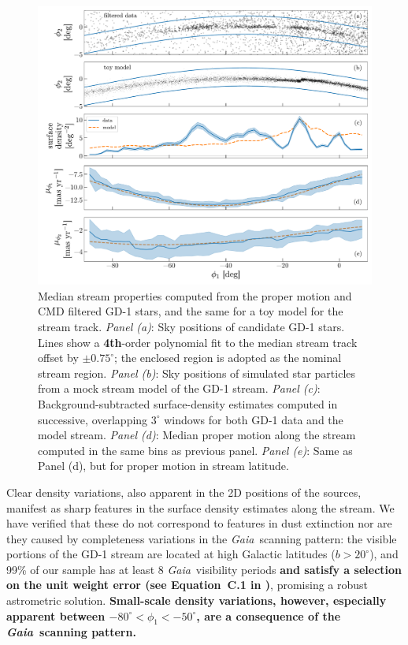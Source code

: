 \documentclass[modern]{aastex62}
\newcommand{\gaia}{\textsl{Gaia}}
\newcommand{\changes}[1]{{\textbf{#1}}}
\begin{document}
\begin{figure}
\begin{center}
\includegraphics[width=\textwidth]{track_observables.pdf}
\end{center}
\caption{%
Median stream properties computed from the proper motion and CMD filtered GD-1
stars, and the same for a toy model for the stream track.
\textit{Panel (a)}: Sky positions of candidate GD-1 stars.
Lines show a \changes{4th}-order polynomial fit to the median stream track offset by $\pm 0.75^\circ$; the enclosed region is adopted as the nominal stream region.
\textit{Panel (b)}: Sky positions of simulated star particles from a mock stream
model of the GD-1 stream.
\textit{Panel (c)}: Background-subtracted surface-density estimates computed in
successive, overlapping $3^\circ$ windows for both GD-1 data and the model
stream.
\textit{Panel (d)}: Median proper motion along the stream computed in the same
bins as previous panel.
\textit{Panel (e)}: Same as Panel (d), but for proper motion in stream latitude.
}
\label{fig:track-and-model}
\end{figure}

Clear density variations, also apparent in the 2D positions of the sources, manifest as sharp features in the surface density estimates along the stream.
We have verified that these do not correspond to features in dust extinction nor are they caused by completeness variations in the \gaia\ scanning pattern:
the visible portions of the GD-1 stream are located at high Galactic latitudes ($b > 20^\circ$), and 99\% of our sample has at least 8 \gaia\ visibility periods \changes{and satisfy a selection on the unit weight error (see Equation~C.1 in \citealt{Lindegren:2018})}, promising a robust astrometric solution.
\changes{
Small-scale density variations, however, especially apparent between $-80^\circ < \phi_1 < -50^\circ$, are a consequence of the \gaia\ scanning pattern.
}
\end{document}
